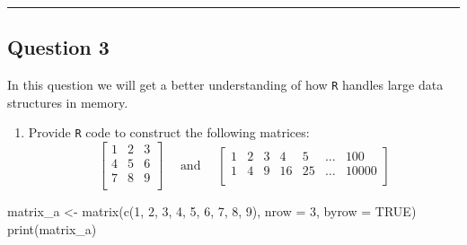 \documentclass[
  letterpaper,
  DIV=11,
  numbers=noendperiod]{scrartcl}
\newenvironment{Shaded}{\begin{snugshade}}{\end{snugshade}}
\newcommand{\AttributeTok}[1]{\textcolor[rgb]{0.40,0.45,0.13}{#1}}
\newcommand{\ConstantTok}[1]{\textcolor[rgb]{0.56,0.35,0.01}{#1}}
\newcommand{\DecValTok}[1]{\textcolor[rgb]{0.68,0.00,0.00}{#1}}
\newcommand{\FunctionTok}[1]{\textcolor[rgb]{0.28,0.35,0.67}{#1}}
\newcommand{\NormalTok}[1]{\textcolor[rgb]{0.00,0.23,0.31}{#1}}
\newcommand{\OtherTok}[1]{\textcolor[rgb]{0.00,0.23,0.31}{#1}}
\providecommand{\tightlist}{%
  \setlength{\itemsep}{0pt}\setlength{\parskip}{0pt}}\usepackage{longtable,booktabs,array}
\begin{document}
\begin{center}\rule{0.5\linewidth}{0.5pt}\end{center}

\hypertarget{question-3}{%
\subsection{Question 3}\label{question-3}}

\begin{tcolorbox}[enhanced jigsaw, toprule=.15mm, breakable, rightrule=.15mm, coltitle=black, colframe=quarto-callout-tip-color-frame, bottomtitle=1mm, toptitle=1mm, titlerule=0mm, opacityback=0, title=\textcolor{quarto-callout-tip-color}{\faLightbulb}\hspace{0.5em}{50 points}, bottomrule=.15mm, arc=.35mm, leftrule=.75mm, colback=white, opacitybacktitle=0.6, left=2mm, colbacktitle=quarto-callout-tip-color!10!white]

\end{tcolorbox}

In this question we will get a better understanding of how \texttt{R}
handles large data structures in memory.

\begin{enumerate}
\def\labelenumi{\arabic{enumi}.}
\tightlist
\item
  Provide \texttt{R} code to construct the following matrices: \[
  \begin{bmatrix} 
  1 & 2 & 3\\
  4 & 5 & 6\\
  7 & 8 & 9\\
  \end{bmatrix}
  \quad \text{ and } \quad
  \begin{bmatrix} 
  1 & 2 & 3 & 4 & 5 & \dots & 100\\
  1 & 4 & 9 & 16 & 25 & \dots & 10000\\
  \end{bmatrix}
  \]
\end{enumerate}

\begin{Shaded}
\begin{Highlighting}[]
\NormalTok{matrix\_a }\OtherTok{\textless{}{-}} \FunctionTok{matrix}\NormalTok{(}\FunctionTok{c}\NormalTok{(}\DecValTok{1}\NormalTok{, }\DecValTok{2}\NormalTok{, }\DecValTok{3}\NormalTok{, }\DecValTok{4}\NormalTok{, }\DecValTok{5}\NormalTok{, }\DecValTok{6}\NormalTok{, }\DecValTok{7}\NormalTok{, }\DecValTok{8}\NormalTok{, }\DecValTok{9}\NormalTok{), }\AttributeTok{nrow =} \DecValTok{3}\NormalTok{, }\AttributeTok{byrow =} \ConstantTok{TRUE}\NormalTok{)}
\FunctionTok{print}\NormalTok{(matrix\_a)}
\end{Highlighting}
\end{Shaded}
\end{document}
